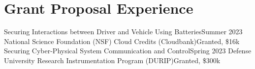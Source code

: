 \section{Grant Proposal Experience}
  \CVSubHeadingListStart
    \CVSubheading
      {Securing Interactions between Driver and Vehicle Using Batteries}{Summer 2023}
      {National Science Foundation (NSF) Cloud Credits (Cloudbank)}{Granted, \$16k}
    \CVSubheading
      {Securing Cyber-Physical System Communication and Control}{Spring 2023}
      {Defense University Research Instrumentation Program (DURIP)}{Granted, \$300k}
  \CVSubHeadingListEnd